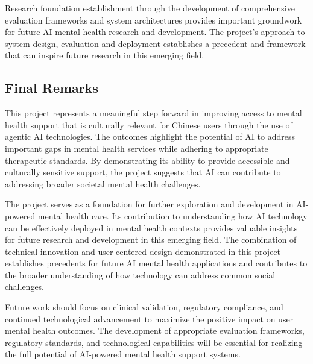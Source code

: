 Research foundation establishment through the development of comprehensive evaluation frameworks and system architectures provides important groundwork for future AI mental health research and development. The project's approach to system design, evaluation and deployment establishes a precedent and framework that can inspire future research in this emerging field.

\subsection{Final Remarks}

This project represents a meaningful step forward in improving access to mental health support that is culturally relevant for Chinese users through the use of agentic AI technologies. The outcomes highlight the potential of AI to address important gaps in mental health services while adhering to appropriate therapeutic standards. By demonstrating its ability to provide accessible and culturally sensitive support, the project suggests that AI can contribute to addressing broader societal mental health challenges.

The project serves as a foundation for further exploration and development in AI-powered mental health care. Its contribution to understanding how AI technology can be effectively deployed in mental health contexts provides valuable insights for future research and development in this emerging field. The combination of technical innovation and user-centered design demonstrated in this project establishes precedents for future AI mental health applications and contributes to the broader understanding of how technology can address common social challenges.

Future work should focus on clinical validation, regulatory compliance, and continued technological advancement to maximize the positive impact on user mental health outcomes. The development of appropriate evaluation frameworks, regulatory standards, and technological capabilities will be essential for realizing the full potential of AI-powered mental health support systems.